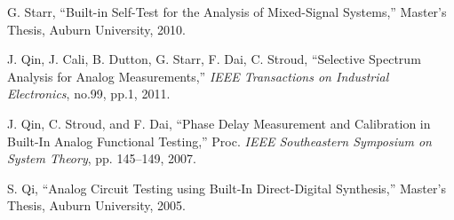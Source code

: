 \documentclass[12pt]{report}
\begin{document}
\begin{thebibliography}{99}
 G. Starr, ``Built-in Self-Test for the Analysis of Mixed-Signal Systems,'' Master's Thesis, Auburn University, 2010.

 J. Qin, J. Cali, B. Dutton, G. Starr, F. Dai, C. Stroud, ``Selective Spectrum Analysis for Analog Measurements,'' \textit{IEEE Transactions on Industrial Electronics}, no.99, pp.1, 2011.

 J. Qin, C. Stroud, and F. Dai, ``Phase Delay Measurement and Calibration in Built-In Analog Functional Testing,” Proc. \textit{IEEE Southeastern Symposium on System Theory}, pp. 145–149, 2007.

 S. Qi, ``Analog Circuit Testing using Built-In Direct-Digital Synthesis,'' Master's Thesis, Auburn University, 2005.

\label{Bibliography}
\end{thebibliography}

\appendix
{}
\end{document}

